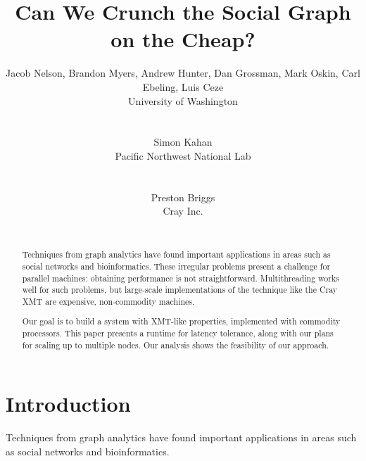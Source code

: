 \documentclass{acm_proc_article-sp}
\begin{document}
\title{Can We Crunch the Social Graph on the Cheap?}

\author{
Jacob Nelson, Brandon Myers, Andrew Hunter, Dan Grossman, Mark Oskin,
Carl Ebeling, Luis Ceze\\
University of Washington\\
\\ \\
Simon Kahan \\ 
Pacific Northwest National Lab\\
\\ \\
Preston Briggs\\ 
Cray Inc.\\
\\
}

\maketitle
\begin{abstract}

 Techniques from graph analytics have found important applications in
  areas such as social networks and bioinformatics. These irregular
  problems present a challenge for parallel machines: obtaining
  performance is not straightforward. Multithreading works well for
  such problems, but large-scale implementations of the technique like
  the Cray XMT are expensive, non-commodity machines.

  Our goal is to build a system with XMT-like properties, implemented
  with commodity processors. This paper presents a runtime for latency
  tolerance, along with our plans for scaling up to multiple
  nodes. Our analysis shows the feasibility of our approach.
\end{abstract}

\section{Introduction}


Techniques from graph analytics have found important applications in
areas such as social networks and bioinformatics. 


\end{document}
